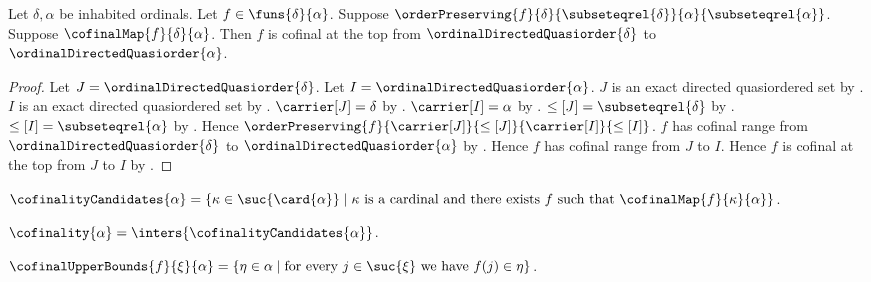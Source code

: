 \begin{theorem}\label{monotone_cofinal_map_is_ordinal_at_top_cofinal}
    Let $\delta,\alpha$ be inhabited ordinals.
    Let $f\in\funs{\delta}{\alpha}$.
    Suppose $\orderPreserving{f}{\delta}{\subseteqrel{\delta}}
        {\alpha}{\subseteqrel{\alpha}}$.
    Suppose $\cofinalMap{f}{\delta}{\alpha}$.
    Then $f$ is cofinal at the top from
        $\ordinalDirectedQuasiorder{\delta}$ to
        $\ordinalDirectedQuasiorder{\alpha}$.
\end{theorem}
\begin{proof}
    Let $J=\ordinalDirectedQuasiorder{\delta}$.
    Let $I=\ordinalDirectedQuasiorder{\alpha}$.
    $J$ is an exact directed quasiordered set by
        .
    $I$ is an exact directed quasiordered set by
        .
    $\carrier[J]=\delta$ by
        .
    $\carrier[I]=\alpha$ by
        .
    $\leq[J]=\subseteqrel{\delta}$ by
        .
    $\leq[I]=\subseteqrel{\alpha}$ by
        .
    Hence $\orderPreserving{f}{\carrier[J]}{\leq[J]}
        {\carrier[I]}{\leq[I]}$.
    $f$ has cofinal range from
        $\ordinalDirectedQuasiorder{\delta}$ to
        $\ordinalDirectedQuasiorder{\alpha}$ by
        .
    Hence $f$ has cofinal range from $J$ to $I$.
    Hence $f$ is cofinal at the top from $J$ to $I$ by
        .
\end{proof}

\begin{definition}\label{cofinality_candidates}
    $\cofinalityCandidates{\alpha}
        =\{\kappa\in\suc{\card{\alpha}}\mid
            \text{$\kappa$ is a cardinal and there exists $f$ such that
            $\cofinalMap{f}{\kappa}{\alpha}$}\}$.
\end{definition}

\begin{definition}\label{cofinality}
    $\cofinality{\alpha}=\inters{\cofinalityCandidates{\alpha}}$.
\end{definition}

\begin{definition}\label{cofinal_upper_bounds}
    $\cofinalUpperBounds{f}{\xi}{\alpha}
        =\{\eta\in\alpha\mid
            \text{for every $j\in\suc{\xi}$ we have $f(j)\in\eta$}\}$.
\end{definition}

